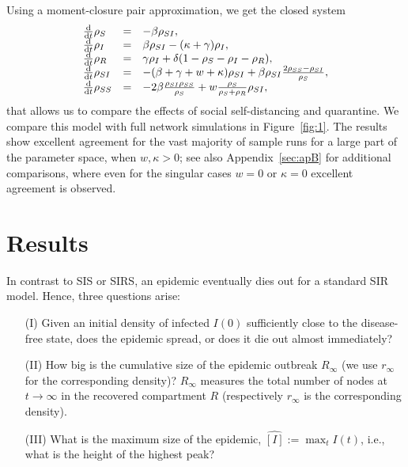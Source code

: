 \documentclass[12pt]{article}
\def\txtd{{\textnormal{d}}}
\begin{document}
 Using a moment-closure pair approximation, we get the closed system 
\begin{equation}
\label{eq:mfa}
  \begin{array}{lcl}
  \frac{\txtd }{\txtd t}{\rho_S}&=&-\beta \rho_{SI},\\ 
  \frac{\txtd }{\txtd t}{\rho_{I}}&= &
  \beta\rho_{SI}-(\kappa+\gamma)\rho_{I},\\
  \frac{\txtd }{\txtd t}{\rho_{R}}&=&
  \gamma\rho_I +\delta (1-\rho_{S}-\rho_{I}-\rho_{R}),\\
  \frac{\txtd }{\txtd t}{\rho_{SI}}&=&
  -(\beta+\gamma+w+\kappa)\rho_{SI}+\beta\rho_{SI}\frac{2\rho_{SS}-\rho_{SI}}{\rho_S},\\
  \frac{\txtd }{\txtd t}{\rho_{SS}}&=& - 2\beta\frac{\rho_{SI}\rho_{SS}}{\rho_{S}}+w\frac{\rho_S}{\rho_S+\rho_{R}}\rho_{SI},
  \end{array}
 \end{equation}
 that allows us to compare the effects of social self-distancing and quarantine. We compare this model with full network simulations in Figure~\ref{fig:1}. The results show excellent agreement for the vast majority of sample runs for a large part of the parameter space, when $w,\kappa>0$; see also Appendix~\ref{sec:apB} for additional comparisons, where even for the singular cases $w=0$ or $\kappa=0$ excellent agreement is observed. 

\section{Results}
\label{sec:results}

In contrast to SIS or SIRS, an epidemic eventually dies out for a standard SIR model. Hence, three questions arise:
\begin{enumerate}
    \item[(I)] Given an initial density of infected $I(0)$ sufficiently close to the disease-free state, does the epidemic spread, or does it die out almost immediately?
\item[(II)]How big is the cumulative size of the epidemic outbreak $R_\infty$ (we use $r_\infty$ for the corresponding density)? $R_\infty$ measures the total number of nodes at $t\to\infty$ in the recovered compartment $R$ (respectively $r_\infty$ is the corresponding density).
\item[(III)]What is the maximum size of the epidemic, $\hat{[I]}:=\max_tI(t)$, i.e., what is the height of the highest peak?
\end{enumerate}\medskip  
\end{document}
